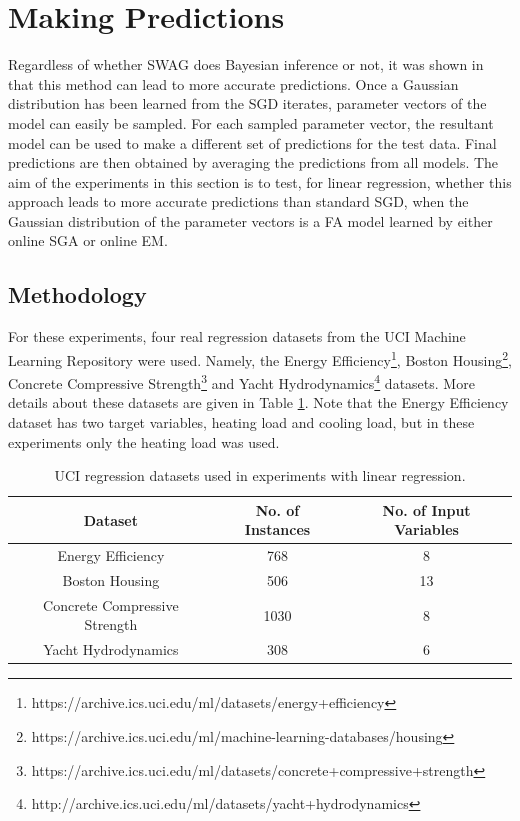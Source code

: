 \documentclass[msc,deptreport.inf]{infthesis} %
\begin{document}
\section{Making Predictions}

Regardless of whether SWAG does Bayesian inference or not, it was shown in \cite{maddox2019} that this method can lead to more accurate predictions. Once a Gaussian distribution has been learned from the SGD iterates, parameter vectors of the model can easily be sampled. For each sampled parameter vector, the resultant model can be used to make a different set of predictions for the test data. Final predictions are then obtained by averaging the predictions from all models. The aim of the experiments in this section is to test, for linear regression, whether this approach leads to more accurate predictions than standard SGD, when the Gaussian distribution of the parameter vectors is a FA model learned by either online SGA or online EM. 

\subsection{Methodology}

For these experiments, four real regression datasets from the UCI Machine Learning Repository \cite{dua2019} were used. Namely, the Energy Efficiency\footnote{https://archive.ics.uci.edu/ml/datasets/energy+efficiency}, Boston Housing\footnote{https://archive.ics.uci.edu/ml/machine-learning-databases/housing}, Concrete Compressive Strength\footnote{https://archive.ics.uci.edu/ml/datasets/concrete+compressive+strength} and Yacht Hydrodynamics\footnote{http://archive.ics.uci.edu/ml/datasets/yacht+hydrodynamics} datasets. More details about these datasets are given in Table \ref{table:uci_datasets}. Note that the Energy Efficiency dataset has two target variables, heating load and cooling load, but in these experiments only the heating load was used. 

\begin{table}[h!]
	\begin{center}
		\begin{tabular}{||c c c ||} 
			\hline
 			Dataset & No. of Instances & No. of Input Variables \\ [0.5ex] 
			\hline\hline
			Energy Efficiency & 768 & 8 \\
 			\hline
 			Boston Housing & 506 & 13 \\ 
 			\hline
 			Concrete Compressive Strength & 1030 & 8 \\
 			\hline
 			Yacht Hydrodynamics & 308 & 6 \\ [1ex] 
 			\hline
		\end{tabular}
		\caption{UCI regression datasets used in experiments with linear regression.}
		\label{table:uci_datasets}
	\end{center}
\end{table}
\end{document}
